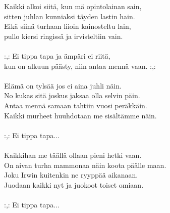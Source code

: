 
            Kaikki alkoi siitä, kun mä opintolainan sain, \\
            sitten juhlan kunniaksi täyden lastin hain. \\
            Eikä siinä turhaan liioin kainosteltu lain, \\
            pullo kiersi ringissä ja irvisteltiin vain. \\
\hspace{10mm} \\
            :,: Ei tippa tapa ja ämpäri ei riitä, \\
            kun on alkuun päästy, niin antaa mennä vaan. :,: \\
\hspace{10mm} \\
            Elämä on tylsää jos ei aina juhli näin. \\
            No kukas sitä joskus jaksaa olla selvin päin. \\
            Antaa mennä samaan tahtiin vuosi peräkkäin. \\
            Kaikki murheet huuhdotaan me sisältämme näin. \\
\hspace{10mm} \\
            :,: Ei tippa tapa... \\
\hspace{10mm} \\
            Kaikkihan me täällä ollaan pieni hetki vaan. \\
            On aivan turha mammonaa näin koota päälle maan. \\
            Joku Irwin kuitenkin ne ryyppää aikanaan. \\
            Juodaan kaikki nyt ja juokoot toiset omiaan. \\
\hspace{10mm} \\
            :,: Ei tippa tapa... \\

